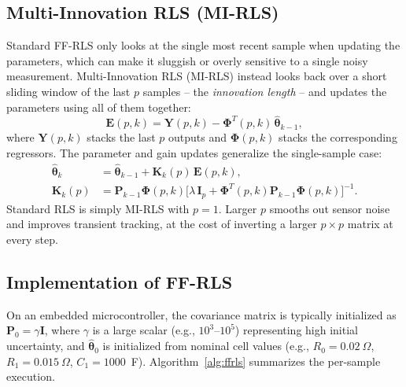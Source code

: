 \subsection{Multi-Innovation RLS (MI-RLS)}
\label{subsec:ch5_mirls}

Standard FF-RLS only looks at the single most recent sample when updating the parameters, which can make it sluggish or overly sensitive to a single noisy measurement. Multi-Innovation RLS (MI-RLS) instead looks back over a short sliding window of the last $p$ samples -- the \emph{innovation length} -- and updates the parameters using all of them together:
\begin{equation}
\mathbf{E}(p, k) = \mathbf{Y}(p, k) - \mathbf{\Phi}^T(p, k)\, \hat{\boldsymbol{\theta}}_{k-1},
\end{equation}
where $\mathbf{Y}(p,k)$ stacks the last $p$ outputs and $\mathbf{\Phi}(p,k)$ stacks the corresponding regressors. The parameter and gain updates generalize the single-sample case:
\begin{align}
\hat{\boldsymbol{\theta}}_k &= \hat{\boldsymbol{\theta}}_{k-1} + \mathbf{K}_k(p)\, \mathbf{E}(p, k), \\
\mathbf{K}_k(p) &= \mathbf{P}_{k-1} \mathbf{\Phi}(p, k) \Big[\lambda\, \mathbf{I}_{p} + \mathbf{\Phi}^T(p, k) \mathbf{P}_{k-1} \mathbf{\Phi}(p, k)\Big]^{-1}.
\end{align}
Standard RLS is simply MI-RLS with $p = 1$. Larger $p$ smooths out sensor noise and improves transient tracking, at the cost of inverting a larger $p \times p$ matrix at every step.

\subsection{Implementation of FF-RLS}
\label{subsec:ch5_ffrls_impl}

On an embedded microcontroller, the covariance matrix is typically initialized as $\mathbf{P}_0 = \gamma \mathbf{I}$, where $\gamma$ is a large scalar (e.g., $10^3$--$10^5$) representing high initial uncertainty, and $\hat{\boldsymbol{\theta}}_0$ is initialized from nominal cell values (e.g., $R_0 = 0.02~\Omega$, $R_1 = 0.015~\Omega$, $C_1 = 1000$~F). Algorithm~\ref{alg:ffrls} summarizes the per-sample execution.

